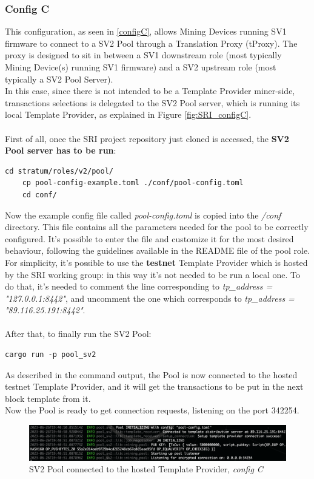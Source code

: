 \subsubsection{Config C}
This configuration, as seen in \ref{configC}, allows Mining Devices running SV1 firmware to connect to a SV2 Pool through a Translation Proxy (tProxy). The proxy is designed to sit in between a SV1 downstream role (most typically Mining Device(s) running SV1 firmware) and a SV2 upstream role (most typically a SV2 Pool Server).\\
In this case, since there is not intended to be a Template Provider miner-side, transactions selections is delegated to the SV2 Pool server, which is running its local Template Provider, as explained in Figure \ref{fig:SRI_configC}.\\\\
First of all, once the SRI project repository just cloned is accessed, the \textbf{SV2 Pool server has to be run}:
\begin{lstlisting}[style=bashStyle, numbers=none]
    cd stratum/roles/v2/pool/
    cp pool-config-example.toml ./conf/pool-config.toml
    cd conf/
\end{lstlisting}
Now the example config file called \textit{pool-config.toml} is copied into the \textit{/conf} directory. This file contains all the parameters needed for the pool to be correctly configured. It's possible to enter the file and customize it for the most desired behaviour, following the guidelines available in the README file of the pool role.
For simplicity, it's possible to use the \textbf{testnet} Template Provider which is hosted by the SRI working group: in this way it's not needed to be run a local one. To do that, it's needed to comment the line corresponding to \textit{tp\_address = "127.0.0.1:8442"}, and uncomment the one which corresponds to \textit{tp\_address = "89.116.25.191:8442"}. \\\\
After that, to finally run the SV2 Pool:
\begin{lstlisting}[style=bashStyle, numbers=none]
    cargo run -p pool_sv2 
\end{lstlisting}
As described in the command output, the Pool is now connected to the hosted testnet Template Provider, and it will get the transactions to be put in the next block template from it.\\ Now the Pool is ready to get connection requests, listening on the port 342254.    
\begin{figure}[h!]
    \centering
    \includegraphics[width=15cm]{Figures/sri/configC_1.png}
    \caption{SV2 Pool connected to the hosted Template Provider, \textit{config C}}
    \label{fig:configC_1}
\end{figure}
